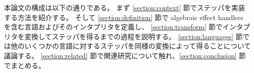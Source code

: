 本論文の構成は以下の通りである。
まず \ref{section:context} 節でステッパを実装する方法を紹介する。
そして \ref{section:definition} 節で algebraic effect handlers を含む言語およびそのインタプリタを定義し、
\ref{section:transform} 節でインタプリタを変換してステッパを得るまでの過程を説明する。
\ref{section:languages} 節では他のいくつかの言語に対するステッパを同様の変換によって得ることについて議論する。
\ref{section:related} 節で関連研究について触れ、\ref{section:conclusion} 節でまとめる。




%
%

